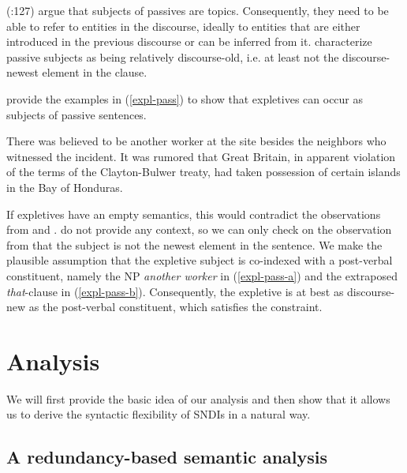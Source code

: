\documentclass[output=paper]{langsci/langscibook}
\begin{document}
\citeauthor{Kuno:Takami:04} (\citeyear{Kuno:Takami:04}:127) argue that subjects of  passives are topics. Consequently, they need to be able to refer to entities in the discourse, ideally to entities that are either introduced in the previous discourse or can be inferred from it. \cite{Ward:Birner:04} characterize passive subjects as being relatively discourse-old, i.e. at least not the discourse-newest element in the clause.

\cite{kaysagidioms} provide the examples in (\ref{expl-pass}) to show that expletives can occur as subjects of passive sentences.

\begin{exe}
\ex\label{expl-pass}
\begin{xlist}
\ex There was believed to be another worker at the site besides the neighbors
who witnessed the incident.\label{expl-pass-a}
\ex It was rumored that Great Britain, in apparent violation of the terms of
the Clayton-Bulwer treaty, had taken possession of certain islands in the
Bay of Honduras. \label{expl-pass-b}
\end{xlist}
\end{exe}

If expletives have an empty semantics, this would contradict the observations from \cite{Kuno:Takami:04} and \cite{Ward:Birner:04}. \cite{kaysagidioms}  do not provide any context, so we can only check on the observation from \cite{Ward:Birner:04} that the subject is not the newest element in the sentence. We make the plausible assumption that the  expletive subject is co-indexed with a post-verbal constituent, namely the NP \textit{another worker} in (\ref{expl-pass-a}) and the extraposed \textit{that}-clause in (\ref{expl-pass-b}). Consequently, the expletive is at best as discourse-new as the post-verbal constituent, which satisfies the constraint.



\section{Analysis}
\label{Sec-Analysis}

We will first provide the basic idea of our analysis and then show that it allows us to derive the syntactic flexibility of SNDIs in a natural way.



\subsection{A redundancy-based semantic analysis}
\end{document}
